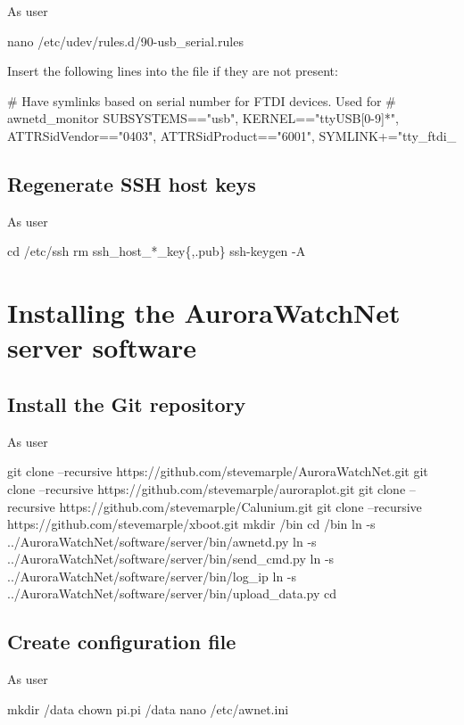 As user \rootUser
\begin{Cmd}
nano /etc/udev/rules.d/90-usb_serial.rules
\end{Cmd}

Insert the following lines into the file if they are not present:
\begin{Cmd}[fontsize=\relsize{-3}]
# Have symlinks based on serial number for FTDI devices. Used for 
# awnetd_monitor
SUBSYSTEMS=="usb", KERNEL=="ttyUSB[0-9]*", ATTRS{idVendor}=="0403", ATTRS{idProduct}=="6001", SYMLINK+="tty_ftdi_%
\end{Cmd}

\subsection{Regenerate SSH host keys}

As user \rootUser
\begin{Cmd}
cd /etc/ssh
rm ssh_host_*_key\{,.pub\}
ssh-keygen -A
\end{Cmd}


\section{Installing the AuroraWatchNet server software}

\subsection{Install the Git repository}
As user \piUser
\begin{Cmd}
git clone --recursive https://github.com/stevemarple/AuroraWatchNet.git 
git clone --recursive https://github.com/stevemarple/auroraplot.git
git clone --recursive https://github.com/stevemarple/Calunium.git
git clone --recursive https://github.com/stevemarple/xboot.git
mkdir \mytilde/bin
cd \mytilde/bin
ln -s ../AuroraWatchNet/software/server/bin/awnetd.py
ln -s ../AuroraWatchNet/software/server/bin/send_cmd.py
ln -s ../AuroraWatchNet/software/server/bin/log_ip
ln -s ../AuroraWatchNet/software/server/bin/upload_data.py
cd \mytilde
\end{Cmd}

\subsection{Create configuration file}

As user \rootUser
\begin{Cmd}
mkdir /data
chown pi.pi /data
nano /etc/awnet.ini
\end{Cmd}

